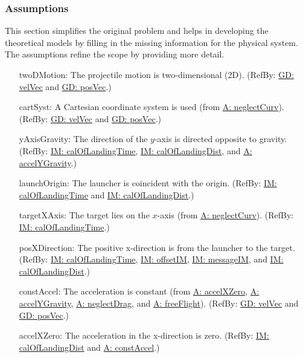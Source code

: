 \documentclass[12pt]{article}
\begin{document}
\subsubsection{Assumptions}
\label{Sec:Assumps}
This section simplifies the original problem and helps in developing the theoretical models by filling in the missing information for the physical system. The assumptions refine the scope by providing more detail.
\begin{itemize}
\item[twoDMotion:\phantomsection\label{twoDMotion}]The projectile motion is two-dimensional (2D). (RefBy: \hyperref[GD:velVec]{GD: velVec} and \hyperref[GD:posVec]{GD: posVec}.)
\item[cartSyst:\phantomsection\label{cartSyst}]A Cartesian coordinate system is used (from \hyperref[neglectCurv]{A: neglectCurv}). (RefBy: \hyperref[GD:velVec]{GD: velVec} and \hyperref[GD:posVec]{GD: posVec}.)
\item[yAxisGravity:\phantomsection\label{yAxisGravity}]The direction of the $y$-axis is directed opposite to gravity. (RefBy: \hyperref[IM:calOfLandingTime]{IM: calOfLandingTime}, \hyperref[IM:calOfLandingDist]{IM: calOfLandingDist}, and \hyperref[accelYGravity]{A: accelYGravity}.)
\item[launchOrigin:\phantomsection\label{launchOrigin}]The launcher is coincident with the origin. (RefBy: \hyperref[IM:calOfLandingTime]{IM: calOfLandingTime} and \hyperref[IM:calOfLandingDist]{IM: calOfLandingDist}.)
\item[targetXAxis:\phantomsection\label{targetXAxis}]The target lies on the $x$-axis (from \hyperref[neglectCurv]{A: neglectCurv}). (RefBy: \hyperref[IM:calOfLandingTime]{IM: calOfLandingTime}.)
\item[posXDirection:\phantomsection\label{posXDirection}]The positive x-direction is from the launcher to the target. (RefBy: \hyperref[IM:calOfLandingTime]{IM: calOfLandingTime}, \hyperref[IM:offsetIM]{IM: offsetIM}, \hyperref[IM:messageIM]{IM: messageIM}, and \hyperref[IM:calOfLandingDist]{IM: calOfLandingDist}.)
\item[constAccel:\phantomsection\label{constAccel}]The acceleration is constant (from \hyperref[accelXZero]{A: accelXZero}, \hyperref[accelYGravity]{A: accelYGravity}, \hyperref[neglectDrag]{A: neglectDrag}, and \hyperref[freeFlight]{A: freeFlight}). (RefBy: \hyperref[GD:velVec]{GD: velVec} and \hyperref[GD:posVec]{GD: posVec}.)
\item[accelXZero:\phantomsection\label{accelXZero}]The acceleration in the x-direction is zero. (RefBy: \hyperref[IM:calOfLandingDist]{IM: calOfLandingDist} and \hyperref[constAccel]{A: constAccel}.)

\end{itemize}
\end{document}

